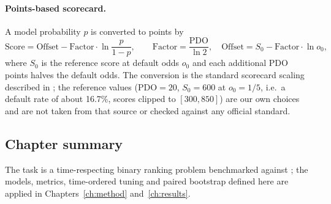 \paragraph{Points-based scorecard.} A model probability $p$ is converted to points by
\begin{equation}
\text{Score}=\text{Offset}-\text{Factor}\cdot\ln\frac{p}{1-p},\qquad \text{Factor}=\frac{\mathrm{PDO}}{\ln 2},\quad \text{Offset}=S_0-\text{Factor}\cdot\ln o_0,
\label{eq:score}
\end{equation}
where $S_0$ is the reference score at default odds $o_0$ and each additional $\mathrm{PDO}$ points halves the default odds. The conversion is the standard scorecard scaling described in \cite{siddiqi2017}; the reference values ($\mathrm{PDO}=20$, $S_0=600$ at $o_0=1/5$, i.e.\ a default rate of about 16.7\%, scores clipped to $[300,850]$) are our own choices and are not taken from that source or checked against any official standard.

\subsection{Chapter summary}

The task is a time-respecting binary ranking problem benchmarked against ; the models, metrics, time-ordered tuning and paired bootstrap defined here are applied in Chapters~\ref{ch:method} and~\ref{ch:results}.
